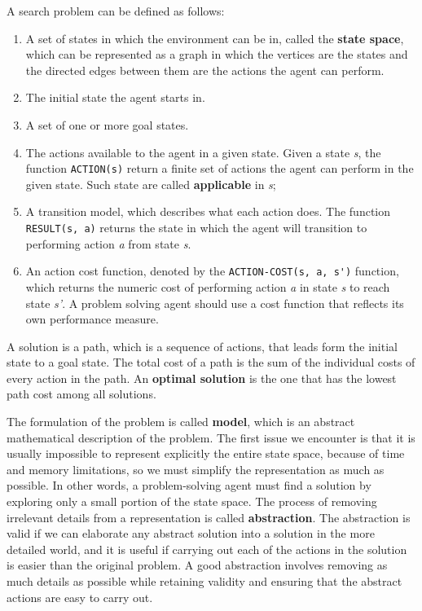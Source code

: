 \documentclass{article}
\newcommand{\code}{\lstinline}
\begin{document}
\noindent
A search problem can be defined as follows:
\begin{enumerate}
    \item A set of states in which the environment can be in, called the \textbf{state space}, which can be represented as a graph in which the vertices are the states and the directed edges between them are the actions the agent can perform. 
    \item The initial state the agent starts in.
    \item A set of one or more goal states.
    \item The actions available to the agent in a given state. Given a state \textit{s}, the function \code{ACTION(s)} return a finite set of actions the agent can perform in the given state. Such state are called \textbf{applicable} in \textit{s};
    \item A transition model, which describes what each action does. The function \code{RESULT(s, a)} returns the state in which the agent will transition to performing action \textit{a} from state \textit{s}.
    \item An action cost function, denoted by the \code{ACTION-COST(s, a, s')} function, which returns the numeric cost of performing action \textit{a} in state \textit{s} to reach state \textit{s'}. A problem solving agent should use a cost function that reflects its own performance measure.
\end{enumerate}

A solution is a path, which is a sequence of actions, that leads form the initial state to a goal state. The total cost of a path is the sum of the individual costs of every action in the path. An \textbf{optimal solution} is the one that has the lowest path cost among all solutions. 

The formulation of the problem is called \textbf{model}, which is an abstract mathematical description of the problem. The first issue we encounter is that it is usually impossible to represent explicitly the entire state space, because of time and memory limitations, so we must simplify the representation as much as possible. In other words, a problem-solving agent must find a solution by exploring only a small portion of the state space. The process of removing irrelevant details from a representation is called \textbf{abstraction}. The abstraction is valid if we can elaborate any abstract solution into a solution in the more detailed world, and it is useful if carrying out each of the actions in the solution is easier than the original problem. A good abstraction involves removing as much details as possible while retaining validity and ensuring that the abstract actions are easy to carry out.
\end{document}
